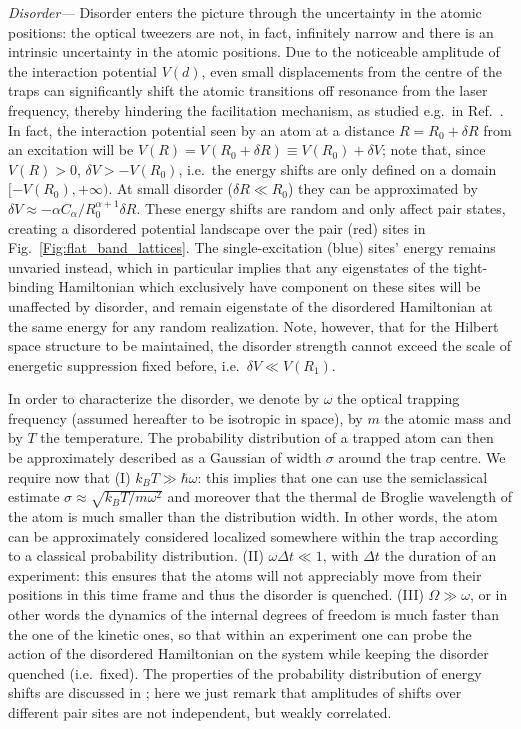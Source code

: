 \documentclass[prl,aps,twocolumn,showpacs,superscriptaddress,longbibliography]{revtex4-1}
\begin{document}
\emph{Disorder---} Disorder enters the picture through the uncertainty in the atomic positions: the optical tweezers are not, in fact, infinitely narrow and there is an intrinsic uncertainty in the atomic positions. Due to the noticeable amplitude of the interaction potential $V(d)$, even small displacements from the centre of the traps can significantly shift the atomic transitions off resonance from the laser frequency, thereby hindering the facilitation mechanism, as studied e.g.~in Ref.~\cite{a_Marcuzzi_PRL_17}. In fact, the interaction potential seen by an atom at a distance $R = R_0 + \delta R$ from an excitation will be $V(R) = V(R_0 + \delta R) \equiv V(R_0) + \delta V$; note that, since $V(R) >0$, $\delta V > - V(R_0)$, i.e.~the energy shifts are only defined on a domain $[-V(R_0), +\infty)$. At small disorder ($\delta R \ll R_0$) they can be approximated by $\delta V \approx -\alpha C_\alpha / R_0^{\alpha + 1} \delta R$. These energy shifts are random and only affect pair states, creating a disordered potential landscape over the pair (red) sites in Fig.~\ref{Fig:flat_band_lattices}. The single-excitation (blue) sites' energy remains unvaried instead, which in particular implies that any eigenstates of the tight-binding Hamiltonian which exclusively have component on these sites will be unaffected by disorder, and remain eigenstate of the disordered Hamiltonian at the same energy for any random realization. Note, however, that for the Hilbert space structure to be maintained, the disorder strength cannot exceed the scale of energetic suppression fixed before, i.e.~$\delta V \ll V(R_1)$. 

In order to characterize the disorder, we denote by $\omega$ the optical trapping frequency (assumed hereafter to be isotropic in space), by $m$ the atomic mass and by $T$ the temperature. The probability distribution of a trapped atom can then be approximately described as a Gaussian of width $\sigma$ around the trap centre. We require now that (I) $k_B T \gg \hbar \omega$: this implies that one can use the semiclassical estimate $\sigma \approx \sqrt{k_B T / m\omega^2}$ and moreover that the thermal de Broglie wavelength of the atom is much smaller than the distribution width. In other words, the atom can be approximately considered localized somewhere within the trap according to a classical probability distribution. (II) $\omega \Delta t \ll 1$, with $\Delta t$ the duration of an experiment: this ensures that the atoms will not appreciably move from their positions in this time frame and thus the disorder is quenched. (III) $\Omega \gg \omega$, or in other words the dynamics of the internal degrees of freedom is much faster than the one of the kinetic ones, so that within an experiment one can probe the action of the disordered Hamiltonian on the system while keeping the disorder quenched (i.e.~fixed). The properties of the probability distribution of energy shifts are discussed in \cite{SM}; here we just remark that amplitudes of shifts over different pair sites are not independent, but weakly correlated.
\end{document}
